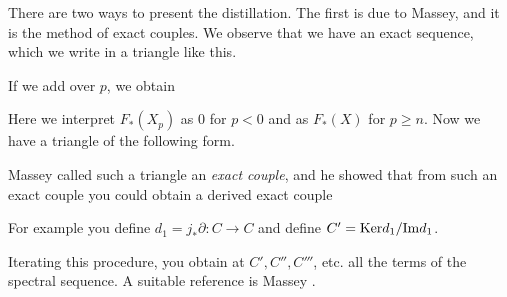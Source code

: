 \documentclass[../main]{subfiles}
\begin{document}
There are two ways to present the distillation. The first is due to Massey, and it is the method of exact couples. We observe that we have an exact sequence, which we write in a triangle like this.
\begin{center}
\end{center}

If we add over $p$, we obtain

\begin{center}
\end{center}

Here we interpret $F_{\ast}(X_p)$ as $0$ for $p<0$ and as $F_{\ast}(X)$ for $p\geq n$. Now we have a triangle of the following form.

\begin{center}
\end{center}

Massey called such a triangle an \emph{exact couple}, and he showed that from such an exact couple you could obtain a derived exact couple

\begin{center}
\end{center}

For example you define $d_1=j_{\ast}\partial\colon C\longrightarrow C$ and define $C'=\mathrm{Ker} d_1/\mathrm{Im} d_1$.

Iterating this procedure, you obtain at $C',C'',C'''$, etc. all the terms of the spectral sequence. A suitable reference is Massey \cite{massey}.
\end{document}
